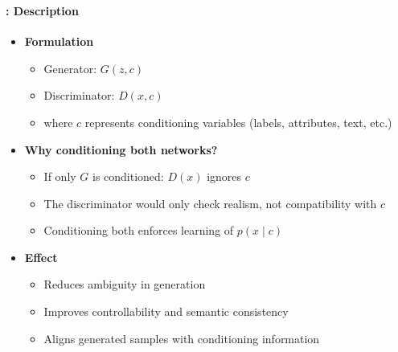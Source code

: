 \documentclass[xcolor=table]{beamer}
\begin{document}
	\begin{frame}
		\frametitle{\insertshortsubtitle}
		\framesubtitle{\insertsection: Description}
		
		\begin{itemize}
			\item \textbf{Formulation}
			\begin{itemize}
				\item Generator:
				$G(z, c)$
				
				\item Discriminator:
				$D(x, c)$
				
				\item where \(c\) represents conditioning variables (labels, attributes, text, etc.)
			\end{itemize}
			
			\item \textbf{Why conditioning both networks?}
			\begin{itemize}
				\item If only \(G\) is conditioned: \(D(x)\) ignores \(c\)
				\item The discriminator would only check realism, not compatibility with \(c\)
				\item Conditioning both enforces learning of \(p(x \mid c)\)
			\end{itemize}
			
			\item \textbf{Effect}
			\begin{itemize}
				\item Reduces ambiguity in generation
				\item Improves controllability and semantic consistency
				\item Aligns generated samples with conditioning information
			\end{itemize}
			
		\end{itemize}
		
	\end{frame}
	
\end{document}
